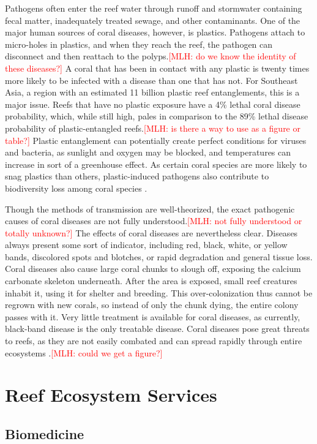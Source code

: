 \documentclass{book}\usepackage{knitr}
\newcommand{\red}[1]{\textcolor{red}{[MLH: #1]}}
\begin{document}
\begin{knitrout}
\begin{kframe}
{Pathogens often enter the reef water through runoff and stormwater containing fecal matter, inadequately treated sewage, and other contaminants. One of the major human sources of coral diseases, however, is plastics. Pathogens attach to micro-holes in plastics, and when they reach the reef, the pathogen can disconnect and then reattach to the polyps.\red{do we know the identity of these diseases?} A coral that has been in contact with any plastic is twenty times more likely to be infected with a disease than one that has not. For Southeast Asia, a region with an estimated 11 billion plastic reef entanglements, this is a major issue. Reefs that have no plastic exposure have a 4\% lethal coral disease probability, which, while still high, pales in comparison to the 89\% lethal disease probability of plastic-entangled reefs.\red{is there a way to use as a figure or table?} Plastic entanglement can potentially create perfect conditions for viruses and bacteria, as sunlight and oxygen may be blocked, and temperatures can increase in sort of a greenhouse effect. As certain coral species are more likely to snag plastics than others, plastic-induced pathogens also contribute to biodiversity loss among coral species \citep{Thompson}.

Though the methods of transmission are well-theorized, the exact pathogenic causes of coral diseases are not fully understood.\red{not fully understood or totally unknown?} The effects of coral diseases are nevertheless clear. Diseases always present some sort of indicator, including red, black, white, or yellow bands, discolored spots and blotches, or rapid degradation and general tissue loss. Coral diseases also cause large coral chunks to slough off, exposing the calcium carbonate skeleton underneath. After the area is exposed, small reef creatures inhabit it, using it for shelter and breeding. This over-colonization thus cannot be regrown with new corals, so instead of only the chunk dying, the entire colony passes with it. Very little treatment is available for coral diseases, as currently, black-band disease is the only treatable disease. Coral diseases pose great threats to reefs, as they are not easily combated and can spread rapidly through entire ecosystems \citep{coraldiseasenoaa}.\red{could we get a figure?}

\section{Reef Ecosystem Services}

\subsection{Biomedicine}

}
\end{kframe}
\end{knitrout}
\end{document}
